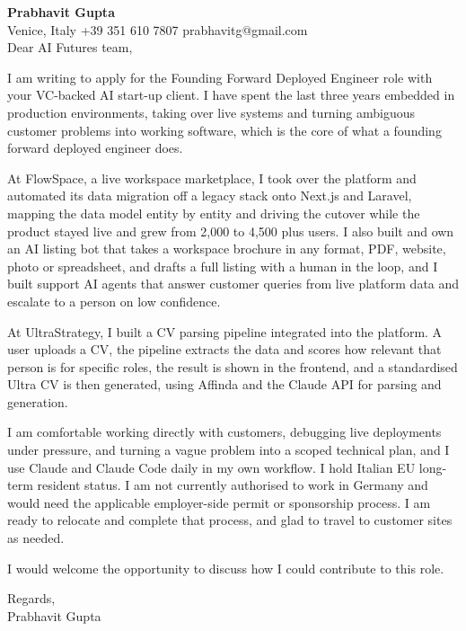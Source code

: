 \documentclass[a4paper,10.5pt]{article}
\begin{document}
\textbf{Prabhavit Gupta}\\
Venice, Italy \textbar{} +39 351 610 7807 \textbar{} prabhavitg@gmail.com\\[10pt]
Dear AI Futures team,

I am writing to apply for the Founding Forward Deployed Engineer role with your VC-backed AI start-up client. I have spent the last three years embedded in production environments, taking over live systems and turning ambiguous customer problems into working software, which is the core of what a founding forward deployed engineer does.

At FlowSpace, a live workspace marketplace, I took over the platform and automated its data migration off a legacy stack onto Next.js and Laravel, mapping the data model entity by entity and driving the cutover while the product stayed live and grew from 2,000 to 4,500 plus users. I also built and own an AI listing bot that takes a workspace brochure in any format, PDF, website, photo or spreadsheet, and drafts a full listing with a human in the loop, and I built support AI agents that answer customer queries from live platform data and escalate to a person on low confidence.

At UltraStrategy, I built a CV parsing pipeline integrated into the platform. A user uploads a CV, the pipeline extracts the data and scores how relevant that person is for specific roles, the result is shown in the frontend, and a standardised Ultra CV is then generated, using Affinda and the Claude API for parsing and generation.

I am comfortable working directly with customers, debugging live deployments under pressure, and turning a vague problem into a scoped technical plan, and I use Claude and Claude Code daily in my own workflow. I hold Italian EU long-term resident status. I am not currently authorised to work in Germany and would need the applicable employer-side permit or sponsorship process. I am ready to relocate and complete that process, and glad to travel to customer sites as needed.

I would welcome the opportunity to discuss how I could contribute to this role.

Regards,\\
Prabhavit Gupta
\end{document}
